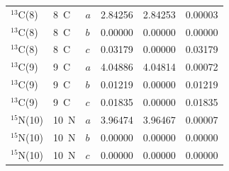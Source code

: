\begin{longtable}{lllrrr}
$^{13}$C(8) & 8~C & $a$ & 2.84256 & 2.84253 & 0.00003 \\
$^{13}$C(8) & 8~C & $b$ & 0.00000 & 0.00000 & 0.00000 \\
$^{13}$C(8) & 8~C & $c$ & 0.03179 & 0.00000 & 0.03179 \\
$^{13}$C(9) & 9~C & $a$ & 4.04886 & 4.04814 & 0.00072 \\
$^{13}$C(9) & 9~C & $b$ & 0.01219 & 0.00000 & 0.01219 \\
$^{13}$C(9) & 9~C & $c$ & 0.01835 & 0.00000 & 0.01835 \\
$^{15}$N(10) & 10~N & $a$ & 3.96474 & 3.96467 & 0.00007 \\
$^{15}$N(10) & 10~N & $b$ & 0.00000 & 0.00000 & 0.00000 \\
$^{15}$N(10) & 10~N & $c$ & 0.00000 & 0.00000 & 0.00000 \\
\bottomrule
\end{longtable}
